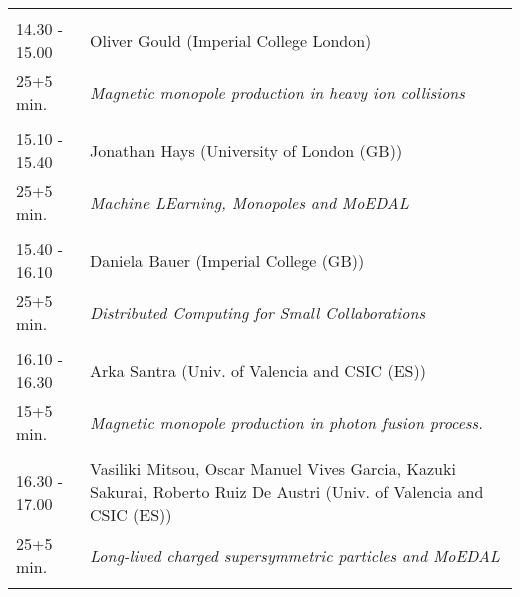 \begin{longtable}{p{3cm}p{13cm}}
 & \\ 
14.30 - 15.00 & Oliver Gould (Imperial College London)\\ 
25+5 min. & {\it Magnetic monopole production in heavy ion collisions}\\ 
 & \\ 
15.10 - 15.40 & Jonathan Hays (University of London (GB))\\ 
25+5 min. & {\it Machine LEarning, Monopoles and MoEDAL}\\ 
 & \\ 
15.40 - 16.10 & Daniela Bauer (Imperial College (GB))\\ 
25+5 min. & {\it Distributed Computing for Small Collaborations}\\ 
 & \\ 
16.10 - 16.30 & Arka Santra (Univ. of Valencia and CSIC (ES))\\ 
15+5 min. & {\it Magnetic monopole production in photon fusion process.}\\ 
 & \\ 
16.30 - 17.00 & Vasiliki Mitsou, Oscar Manuel Vives Garcia, Kazuki Sakurai, Roberto Ruiz De Austri (Univ. of Valencia and CSIC (ES))\\ 
25+5 min. & {\it Long-lived charged supersymmetric particles and MoEDAL}\\ 
 & \\ 
\end{longtable}

